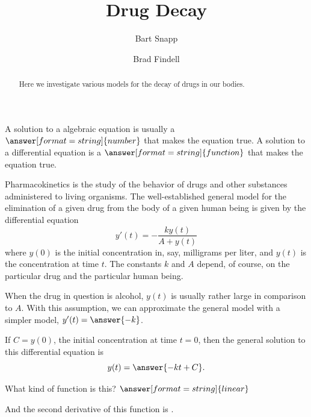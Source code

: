 \documentclass{ximera}
\title{Drug Decay}
\author{Bart Snapp \and Brad Findell}
\begin{document}
\begin{abstract}
Here we investigate various models for the decay of drugs in our bodies.  
\end{abstract}
\maketitle

\begin{question}
A solution to a algebraic equation is usually a $\answer[format=string]{number}$ that makes the equation true.  A solution to a differential equation is a $\answer[format=string]{function}$ that makes the equation true.  
\end{question}

Pharmacokinetics is the study of the behavior of drugs and other substances administered to living organisms.  
The well-established general model for 
the elimination of a given drug from the body of a given human being is given by the differential equation 
$$y'(t)=-\frac{ky(t)}{A+y(t)}$$
where $y(0)$ is the initial concentration in, say, milligrams per liter, and $y(t)$ is the concentration at time $t$.  The constants $k$ and $A$ depend, of course, on the particular drug and the particular human being. 


\begin{question}
When the drug in question is alcohol, $y(t)$ is usually rather large in comparison to $A$.   With this assumption, we can approximate the general model with a simpler model, $y'(t)=\answer{-k}$.    

If $C=y(0)$, the initial concentration at time $t=0$, then the general solution to this differential equation is 
\[  
y(t) =\answer{ -kt + C}.  
\]

What kind of function is this? $\answer[format=string]{linear}$

And the second derivative of this function is .  
\end{question}
\end{document}
